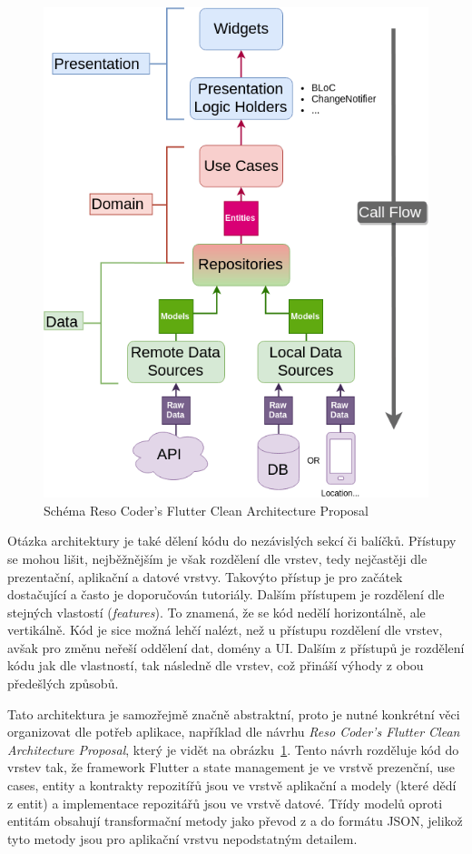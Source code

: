 \begin{figure}[t!]
    \centering
    \includegraphics[width=0.7\linewidth]{assets/technology-research/architecture/reso-coder-clean-architecture.png}
    \caption{Schéma Reso Coder's Flutter Clean Architecture Proposal~\cite{the_clean_architecture}}
    \label{fig:reso_coder_clean_architecture}
\end{figure}

Otázka architektury je také dělení kódu do nezávislých sekcí či balíčků.
Přístupy se mohou lišit,
nejběžnějším je však rozdělení dle vrstev,
tedy nejčastěji dle prezentační, aplikační a datové vrstvy.
Takovýto přístup je pro začátek dostačující a často je doporučován tutoriály.
Dalším přístupem je rozdělení dle stejných vlastostí (\emph{features}).
To znamená,
že se kód nedělí horizontálně,
ale vertikálně.
Kód je sice možná lehčí nalézt,
než u přístupu rozdělení dle vrstev,
avšak pro změnu neřeší oddělení dat, domény a UI.
Dalším z přístupů je rozdělení kódu jak dle vlastností,
tak následně dle vrstev,
což přináší výhody z obou předešlých
způsobů.~\cite[kapitola~34]{the_clean_architecture}

Tato architektura je samozřejmě značně abstraktní,
proto je nutné konkrétní věci organizovat dle potřeb aplikace,
například dle návrhu \emph{Reso Coder's Flutter Clean Architecture Proposal},
který je vidět na obrázku~\ref{fig:reso_coder_clean_architecture}.
Tento návrh rozděluje kód do vrstev tak,
že framework Flutter a state management je ve vrstvě prezenční,
use cases, entity a kontrakty repozitířů jsou ve vrstvě aplikační
a modely (které dědí z entit) a implementace repozitářů jsou ve vrstvě datové.
Třídy modelů oproti entitám obsahují transformační metody jako
převod z a do formátu JSON,
jelikož tyto metody jsou pro aplikační vrstvu nepodstatným
detailem.~\cite{reso_coder_clean_architecture}

